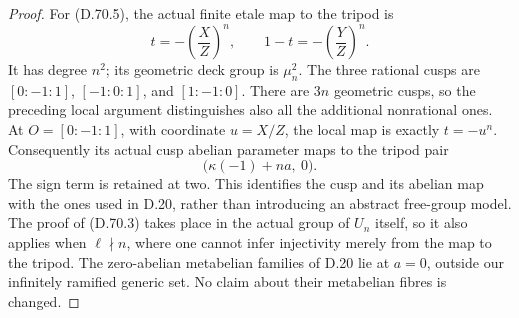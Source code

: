 \begin{proof}
For (D.70.5), the actual finite etale
map to the tripod is
\[
 t=-\left(\frac XZ\right)^n,\qquad
 1-t=-\left(\frac YZ\right)^n.                          \tag{D.70.25}
\]
It has degree \(n^2\); its geometric
deck group is \(\mu_n^2\). The three
rational cusps are \([0:-1:1]\),
\([-1:0:1]\), and \([1:-1:0]\).
There are \(3n\) geometric cusps, so
the preceding local argument distinguishes
also all the additional nonrational ones.
At \(O=[0:-1:1]\), with coordinate
\(u=X/Z\), the local map is exactly
\(t=-u^n\). Consequently its actual
cusp abelian parameter maps to the
tripod pair
\[
                  \bigl(\kappa(-1)+na,\ 0\bigr).
                                                        \tag{D.70.26}
\]
The sign term is retained at two.
This identifies the cusp and its
abelian map with the ones used in
D.20, rather than introducing an
abstract free-group model. The proof
of (D.70.3) takes place in the actual
group of \(U_n\) itself, so it also
applies when \(\ell\nmid n\), where
one cannot infer injectivity merely
from the map to the tripod.
The zero-abelian metabelian families
of D.20 lie at \(a=0\), outside our
infinitely ramified generic set.
No claim about their metabelian
fibres is changed.
\end{proof}

